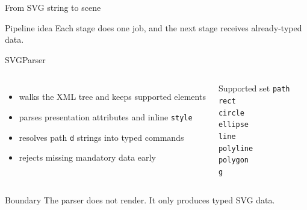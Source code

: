 \documentclass[aspectratio=43]{beamer}
\begin{document}
\begin{frame}{From SVG string to scene}
\small
\begin{center}
\end{center}

\vspace{0.5em}
\begin{block}{Pipeline idea}
Each stage does one job, and the next stage receives already-typed data.
\end{block}
\end{frame}

\begin{frame}{SVGParser}
\small
\begin{columns}[T,onlytextwidth]
	\begin{itemize}
		\item walks the XML tree and keeps supported elements
		\item parses presentation attributes and inline \texttt{style}
		\item resolves path \texttt{d} strings into typed commands
		\item rejects missing mandatory data early
	\end{itemize}

	\begin{block}{Supported set}
	\centering
	\texttt{path}\\
	\texttt{rect}\\
	\texttt{circle}\\
	\texttt{ellipse}\\
	\texttt{line}\\
	\texttt{polyline}\\
	\texttt{polygon}\\
	\texttt{g}
	\end{block}
\end{columns}
\vspace{0.3em}
\begin{alertblock}{Boundary}
The parser does not render. It only produces typed SVG data.
\end{alertblock}
\end{frame}
\end{document}
